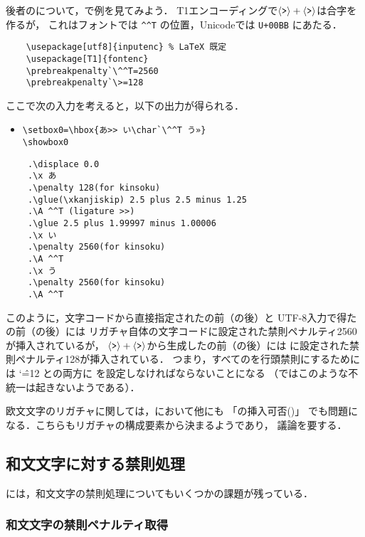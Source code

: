 \documentclass[paper=a4,twocolumn,line_length=24zw,number_of_lines=43]{jlreq}
\begin{document}
後者のについて，\upLaTeX で例を見てみよう．
T1エンコーディングで$\langle\mbox{\texttt{>}}\rangle+\langle\mbox{\texttt{>}}\rangle$は合字を作るが，
これはフォントでは \verb|^^T| の位置，Unicodeでは \verb|U+00BB| にあたる．
\begin{verbatim}
    \usepackage[utf8]{inputenc} % LaTeX 既定
    \usepackage[T1]{fontenc}
    \prebreakpenalty`\^^T=2560
    \prebreakpenalty`\>=128
\end{verbatim}
ここで次の入力を考えると，以下の出力が得られる．
\begin{itemize}
  \item \verb+\setbox0=\hbox{あ>> い\char`\^^T う»}+\\\verb+\showbox0+
\begin{verbnote}
\begin{verbatim}
 .\displace 0.0
 .\x あ
 .\penalty 128(for kinsoku)
 .\glue(\xkanjiskip) 2.5 plus 2.5 minus 1.25
 .\A ^^T (ligature >>)
 .\glue 2.5 plus 1.99997 minus 1.00006
 .\x い
 .\penalty 2560(for kinsoku)
 .\A ^^T
 .\x う
 .\penalty 2560(for kinsoku)
 .\A ^^T
\end{verbatim}
\end{verbnote}
\end{itemize}
このように，文字コードから直接指定されたの前（の後）と
UTF-8入力で得たの前（の後）には
リガチャ自体の文字コードに設定された禁則ペナルティ2560が挿入されているが，
$\langle\mbox{\texttt{>}}\rangle+\langle\mbox{\texttt{>}}\rangle$から生成したの前（の後）には
\codechar{>}に設定された禁則ペナルティ128が挿入されている．
つまり，すべてのを行頭禁則にするためには
{\catcode`\^=12 \codechar{>}と}の両方に
を設定しなければならないことになる
（ではこのような不統一は起きないようである）．

欧文文字のリガチャに関しては，\pTeX において他にも
「の挿入可否()」
でも問題になる．こちらもリガチャの構成要素から決まるようであり，
議論を要する\cite{build85}．

\subsection{和文文字に対する禁則処理}

\pTeX には，和文文字の禁則処理についてもいくつかの課題が残っている．

\subsubsection{和文文字の禁則ペナルティ取得}
\end{document}
